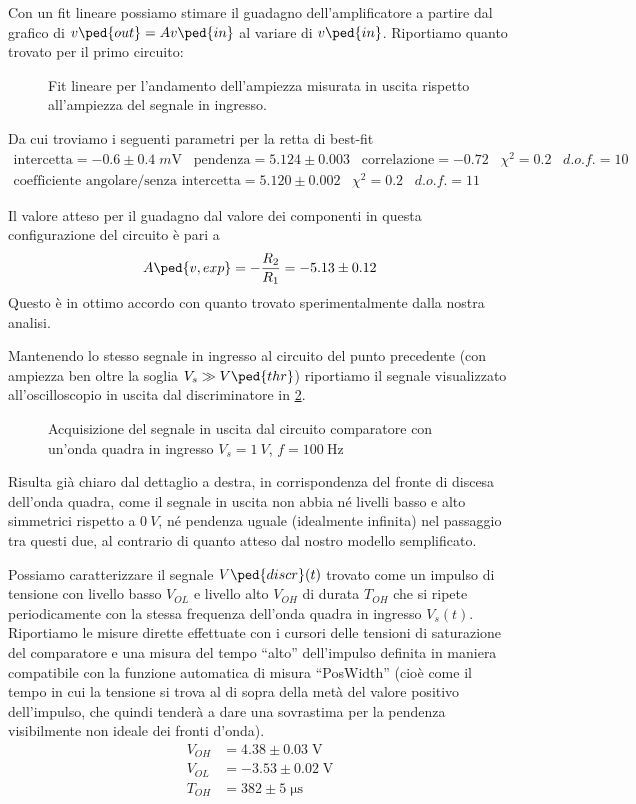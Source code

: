 \documentclass[10pt, a4paper, italian]{article}
\begin{document}
Con un fit lineare possiamo stimare il guadagno dell'amplificatore a partire
dal grafico di $v\ped{out} = A v\ped{in}$ al variare di $v\ped{in}$.
Riportiamo quanto trovato per il primo circuito:
\begin{figure}[htbp]
\centering
\caption{Fit lineare per l'andamento dell'ampiezza misurata in uscita rispetto
all'ampiezza del segnale in ingresso. \label{fig: gainfit}}
\end{figure}
Da cui troviamo i seguenti parametri per la retta di best-fit
\begin{align*}
\mathrm{intercetta} = -0.6 \pm 0.4 \; \si{m\V} \;\;\;\mathrm{pendenza} = 5.124 \pm 0.003 \;\;\;\mathrm{correlazione} 
= -0.72 \;\;\; \chi^2 = 0.2 \;\;\; d.o.f. = 10 \\
\text{coefficiente angolare/senza intercetta} = 5.120 \pm 0.002 \;\;\;
\chi^2 = 0.2 \;\;\; d.o.f. = 11
\end{align*}

Il valore atteso per il guadagno dal valore dei componenti in questa
configurazione del circuito è pari a
\[
A\ped{v, exp} = -\frac{R_2}{R_1} = - 5.13 \pm 0.12
\]
Questo è in ottimo accordo con quanto trovato sperimentalmente dalla nostra
analisi.

Mantenendo lo stesso segnale in ingresso al circuito del punto precedente
(con ampiezza ben oltre la soglia $V_s \gg V\ped{thr}$) riportiamo il
segnale visualizzato all'oscilloscopio in uscita dal discriminatore in
\cref{fig: discr}.
\begin{figure}[htbp]
	\centering
	\caption{Acquisizione del segnale in uscita dal circuito comparatore con
	un'onda quadra in ingresso $V_s = \SI{1}{V}$, $f = \SI{100}{\Hz}$
	\label{fig: discr}}
\end{figure}

Risulta già chiaro dal dettaglio a destra, in corrispondenza del fronte di
discesa dell'onda quadra, come il segnale in uscita non abbia né livelli basso
e alto simmetrici rispetto a $\SI{0}{V}$, né pendenza uguale (idealmente
infinita) nel passaggio tra questi due, al contrario di quanto atteso dal
nostro modello semplificato.

Possiamo caratterizzare il segnale $V\ped{discr} (t)$ trovato come un impulso
di tensione con livello basso $V_{OL}$ e livello alto $V_{OH}$ di durata
$T_{OH}$ che si ripete periodicamente con la stessa frequenza dell'onda quadra
in ingresso $V_s (t)$.
Riportiamo le misure dirette effettuate con i cursori
delle tensioni di saturazione del comparatore e una misura del tempo ``alto''
dell'impulso definita in maniera compatibile con la funzione automatica di
misura ``PosWidth'' (cioè come il tempo in cui la tensione si trova al di
sopra della metà del valore positivo dell'impulso, che quindi tenderà a dare
una sovrastima per la pendenza visibilmente non ideale dei fronti d'onda).
\begin{align*}
V_{OH} &= 4.38 \pm 0.03 \; \si{\V} \\
V_{OL} &= -3.53 \pm 0.02 \; \si{\V} \\
T_{OH} &= 382 \pm 5 \; \si{\micro\s}
\end{align*}
\end{document}
